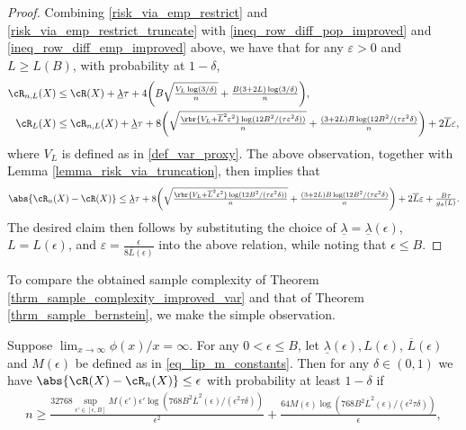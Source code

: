 \documentclass[9pt]{article} %
\numberwithin{equation}{section}
\renewcommand{\frac}[2]{\tfrac{#1}{#2}}
\begin{document}
\begin{proof}
Combining \eqref{risk_via_emp_restrict} and \eqref{risk_via_emp_restrict_truncate} with \eqref{ineq_row_diff_pop_improved} and \eqref{ineq_row_diff_emp_improved} above, we have that for any $\varepsilon > 0$ and $L \geq L(B)$, 
with probability at $1-\delta$,
\begin{align*}
\cR_{n, L}(X) & \leq \cR(X) + \underline{\lambda} \tau + 4 
\bigg({
B \sqrt{\frac{ V_L \log(3/\delta)}{n}} + \frac{B (3 + 2L) \log(3/\delta)}{n} 
} \bigg), \\ 
\cR_L(X) & \leq \cR_{n, L}(X) +  \underline{\lambda}\tau + 
8 \bigg({
\sqrt{\frac{  { \rbr{V_L + \overline{L}^2 \varepsilon^2 }} \log(12 B^2/(\tau \varepsilon^2 \delta))}{n}} + \frac{(3 + 2L)B \log(12 B^2/(\tau \varepsilon^2 \delta)}{n} 
} \bigg)
+ 2 \overline{L} \varepsilon, 
\end{align*}
where $V_L$ is defined as in \eqref{def_var_proxy}.
The above observation, together with Lemma \ref{lemma_risk_via_truncation}, then implies that 
\begin{align*}
\abs{\cR_n(X) - \cR(X)} 
\leq 
 \underline{\lambda}\tau + 
8 \bigg({
\sqrt{\frac{  { \rbr{V_L + \overline{L}^2 \varepsilon^2 }} \log(12 B^2/(\tau \varepsilon^2 \delta))}{n}} + \frac{(3 + 2L)B \log(12 B^2/(\tau \varepsilon^2 \delta)}{n} 
} \bigg)
+ 2 \overline{L} \varepsilon
+ \frac{B\tau}{g_\phi(L)}.
\end{align*}
The desired claim then follows by substituting the choice of 
$\underline{\lambda} = \underline{\lambda}(\epsilon)$,
$L = L(\epsilon)$, and $\varepsilon = \frac{\epsilon}{8 \overline{L}(\epsilon)}$ into the above relation, 
while noting that $\epsilon \leq B$.
\end{proof}


To compare the obtained sample complexity of Theorem \ref{thrm_sample_complexity_improved_var} and that of Theorem \ref{thrm_sample_bernstein}, we make the simple observation.  

\begin{corollary}\label{corr_sample_improved_var}
Suppose $\lim_{x \to \infty} \phi(x) / x = \infty$. 
For any $0 < \epsilon \leq B $, let 
$\underline{\lambda}(\epsilon), L(\epsilon)$, 
 $\overline{L}(\epsilon)$ and $M(\epsilon)$ be defined as in \eqref{eq_lip_m_constants}.
Then 
for any $\delta \in (0,1)$  
we have $\abs{\cR(X) - \cR_n(X)} \leq \epsilon$ with probability at least $1-\delta$
 if 
\begin{align*}
n \geq 
\frac{32768  \sup_{\epsilon' \in [\epsilon, B]}  M(\epsilon') \epsilon'   \log (768 B^2 \overline{L}^2(\epsilon)/ (\epsilon^2 \tau \delta))}{\epsilon^2} 
+ 
\frac{64 M(\epsilon)  \log (768 B^2 \overline{L}^2(\epsilon)/ (\epsilon^2 \tau \delta))}{\epsilon} ,
\end{align*}
\end{corollary}
\end{document}
